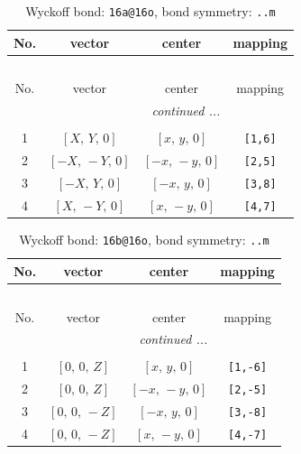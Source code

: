 \documentclass[fleqn,8pt]{jsarticle}
\begin{document}
\begin{longtable}{cccc}
\caption{Wyckoff bond: {\tt 16a@16o}, bond symmetry: {\tt ..m}}
 \\
 \hline \hline
No. & vector & center & mapping \\ \hline \endfirsthead

\multicolumn{3}{l}{\tablename\ \thetable{}} \\
 \hline \hline
No. & vector & center & mapping \\ \hline \endhead

 \hline \hline
\multicolumn{3}{r}{\footnotesize\it continued ...} \\ \endfoot

 \hline \hline
\multicolumn{3}{r}{} \\ \endlastfoot

1 & $\left[ X,\, Y,\, 0 \right]$ & $\left[ x,\, y,\, 0 \right]$ & {\tt [1,6]} \\ \hline
2 & $\left[ - X,\, - Y,\, 0 \right]$ & $\left[ - x,\, - y,\, 0 \right]$ & {\tt [2,5]} \\ \hline
3 & $\left[ - X,\, Y,\, 0 \right]$ & $\left[ - x,\, y,\, 0 \right]$ & {\tt [3,8]} \\ \hline
4 & $\left[ X,\, - Y,\, 0 \right]$ & $\left[ x,\, - y,\, 0 \right]$ & {\tt [4,7]} \\
\end{longtable}
\renewcommand{\arraystretch}{1.2}
\begin{longtable}{cccc}
\caption{Wyckoff bond: {\tt 16b@16o}, bond symmetry: {\tt ..m}}
 \\
 \hline \hline
No. & vector & center & mapping \\ \hline \endfirsthead

\multicolumn{3}{l}{\tablename\ \thetable{}} \\
 \hline \hline
No. & vector & center & mapping \\ \hline \endhead

 \hline \hline
\multicolumn{3}{r}{\footnotesize\it continued ...} \\ \endfoot

 \hline \hline
\multicolumn{3}{r}{} \\ \endlastfoot

1 & $\left[ 0,\, 0,\, Z \right]$ & $\left[ x,\, y,\, 0 \right]$ & {\tt [1,-6]} \\ \hline
2 & $\left[ 0,\, 0,\, Z \right]$ & $\left[ - x,\, - y,\, 0 \right]$ & {\tt [2,-5]} \\ \hline
3 & $\left[ 0,\, 0,\, - Z \right]$ & $\left[ - x,\, y,\, 0 \right]$ & {\tt [3,-8]} \\ \hline
4 & $\left[ 0,\, 0,\, - Z \right]$ & $\left[ x,\, - y,\, 0 \right]$ & {\tt [4,-7]} \\
\end{longtable}
\end{document}
